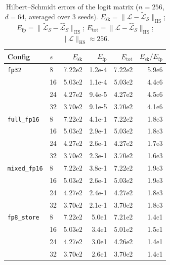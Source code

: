 \begin{table}[ht]
\centering
\caption{Hilbert--Schmidt errors of the logit matrix ($n = 256$, $d = 64$, averaged over 3 seeds). $E_{\mathrm{sk}} = \|\mathcal{L} - \widetilde{\mathcal{L}}_S\|_{\mathrm{HS}}$; $E_{\mathrm{fp}} = \|\widetilde{\mathcal{L}}_S - \widehat{\mathcal{L}}_S\|_{\mathrm{HS}}$; $E_{\mathrm{tot}} = \|\mathcal{L} - \widehat{\mathcal{L}}_S\|_{\mathrm{HS}}$; $\|\mathcal{L}\|_{\mathrm{HS}} \approx 256$.}
\label{tab:results}
\small
\begin{tabular}{ll rrr r}
\toprule
Config & $s$ & $E_{\mathrm{sk}}$ & $E_{\mathrm{fp}}$ & $E_{\mathrm{tot}}$ & $E_{\mathrm{sk}}/E_{\mathrm{fp}}$ \\
\midrule
\texttt{fp32}      &  8 & 7.22e2 & 1.2e-4 & 7.22e2 & 5.9e6 \\
                    & 16 & 5.03e2 & 1.1e-4 & 5.03e2 & 4.4e6 \\
                    & 24 & 4.27e2 & 9.4e-5 & 4.27e2 & 4.5e6 \\
                    & 32 & 3.70e2 & 9.1e-5 & 3.70e2 & 4.1e6 \\
\midrule
\texttt{full\_fp16}  &  8 & 7.22e2 & 4.1e-1 & 7.22e2 & 1.8e3 \\
                      & 16 & 5.03e2 & 2.9e-1 & 5.03e2 & 1.8e3 \\
                      & 24 & 4.27e2 & 2.6e-1 & 4.27e2 & 1.7e3 \\
                      & 32 & 3.70e2 & 2.3e-1 & 3.70e2 & 1.6e3 \\
\midrule
\texttt{mixed\_fp16} &  8 & 7.22e2 & 3.8e-1 & 7.22e2 & 1.9e3 \\
                      & 16 & 5.03e2 & 2.6e-1 & 5.03e2 & 1.9e3 \\
                      & 24 & 4.27e2 & 2.4e-1 & 4.27e2 & 1.8e3 \\
                      & 32 & 3.70e2 & 2.1e-1 & 3.70e2 & 1.8e3 \\
\midrule
\texttt{fp8\_store}  &  8 & 7.22e2 & 5.0e1  & 7.21e2 & 1.4e1 \\
                      & 16 & 5.03e2 & 3.4e1  & 5.01e2 & 1.5e1 \\
                      & 24 & 4.27e2 & 3.0e1  & 4.26e2 & 1.4e1 \\
                      & 32 & 3.70e2 & 2.6e1  & 3.70e2 & 1.4e1 \\
\bottomrule
\end{tabular}
\end{table}

